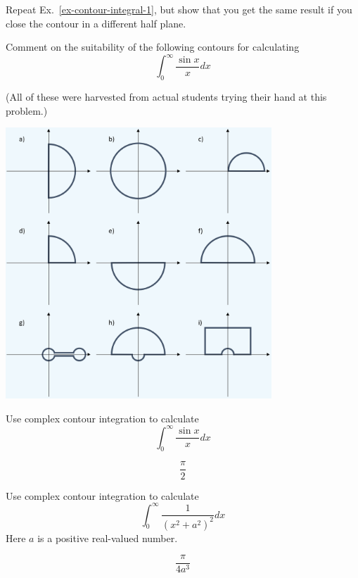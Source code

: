 \begin{exer}
Repeat Ex.~\ref{ex-contour-integral-1}, but show that you get the same result if you close the contour in a different half plane.
\end{exer}

\begin{exer}
  Comment on the suitability of the following contours for calculating
  $$ \int_0^{\infty} \frac{\sin x}{x} dx$$

(All of these were harvested from actual students trying their hand at this problem.)

\begin{center}
\includegraphics[width=10cm]{complex/figures/contours}
\end{center}

\end{exer}

\pagebreak

\begin{exer}
Use complex contour integration to calculate
$$ \int_0^{\infty} \frac{\sin x}{x} dx$$
\begin{sol}
$$\frac{\pi}{2}$$
\end{sol}
\end{exer}

\begin{exer}
Use complex contour integration to calculate
$$ \int_0^{\infty} \frac{1}{\left(x^2 + a^2\right)^2} dx$$
Here $a$ is a positive real-valued number.
\begin{sol}
$$\frac{\pi}{4 a^3}$$
\end{sol}
\end{exer}

